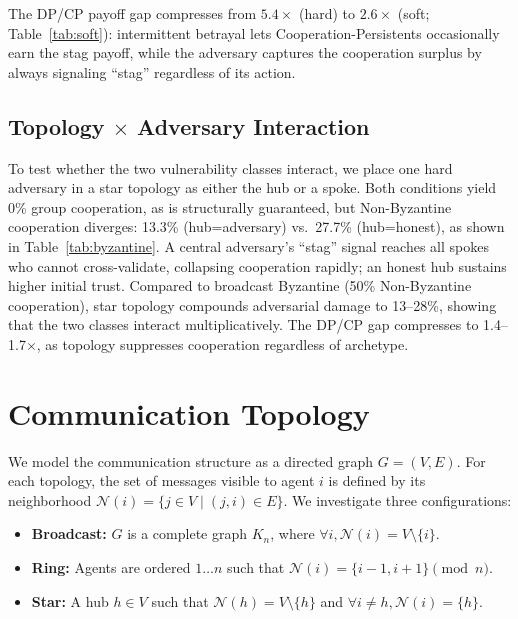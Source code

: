 \documentclass[runningheads]{llncs}
\begin{document}
The DP/CP payoff gap compresses from $5.4\times$ (hard) to $2.6\times$ (soft; Table~\ref{tab:soft}): intermittent betrayal lets Cooperation-Persistents occasionally earn the stag payoff, while the adversary captures the cooperation surplus by always signaling ``stag'' regardless of its action.

\subsection{Topology $\times$ Adversary Interaction}\label{sec:byz-star}

To test whether the two vulnerability classes interact, we place one hard adversary in a star topology as either the hub or a spoke.
Both conditions yield 0\% group cooperation, as is structurally guaranteed, but Non-Byzantine cooperation diverges: 13.3\% (hub=adversary) vs.\ 27.7\% (hub=honest), as shown in Table~\ref{tab:byzantine}.
A central adversary's ``stag'' signal reaches all spokes who cannot cross-validate, collapsing cooperation rapidly; an honest hub sustains higher initial trust.
Compared to broadcast Byzantine (50\% Non-Byzantine cooperation), star topology compounds adversarial damage to 13--28\%, showing that the two classes interact multiplicatively.
The DP/CP gap compresses to 1.4--1.7$\times$, as topology suppresses cooperation regardless of archetype.

\section{Communication Topology}\label{sec:topology}


We model the communication structure as a directed graph $G = (V, E)$. For each topology, the set of messages visible to agent $i$ is defined by its neighborhood $\mathcal{N}(i) = \{j \in V \mid (j, i) \in E\}$. We investigate three configurations:
\begin{itemize}
    \item \textbf{Broadcast:} $G$ is a complete graph $K_n$, where $\forall i, \mathcal{N}(i) = V \setminus \{i\}$.
    \item \textbf{Ring:} Agents are ordered $1 \dots n$ such that $\mathcal{N}(i) = \{i-1, i+1\} \pmod n$.
    \item \textbf{Star:} A hub $h \in V$ such that $\mathcal{N}(h) = V \setminus \{h\}$ and $\forall i \neq h, \mathcal{N}(i) = \{h\}$.
\end{itemize}
\end{document}
